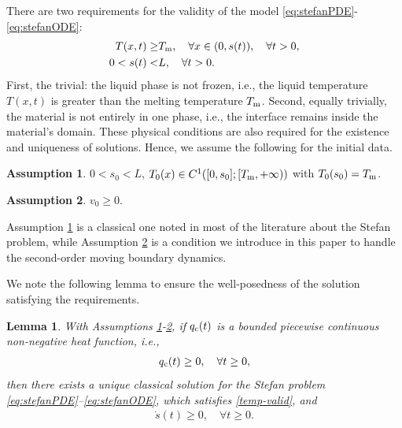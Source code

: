 \documentclass[letterpaper, 10 pt, conference]{cls/ieeeconf}
\newtheorem{lemma}{Lemma}
\theoremstyle{definition}
\newtheorem{assum}{Assumption}
\begin{document}
There are two requirements for the validity of the model \eqref{eq:stefanPDE}-\eqref{eq:stefanODE}:
\begin{align}\label{temp-valid}
T(x,t) \geq& T_{{\rm m}}, \quad  \forall x\in(0,s(t)), \quad \forall t>0, \\
\label{int-valid}0 < s(t)<  &L, \quad \forall t>0. 
\end{align}
First, the trivial: the liquid phase is not frozen, i.e., the liquid temperature $T(x,t)$ is greater than the melting temperature $T_{\rm m}$. Second, equally trivially, the material is not entirely in one phase, i.e., the interface remains inside the material's domain. These physical conditions are also required for the existence and uniqueness of solutions.
Hence, we assume the following for the initial data. 

\begin{assum}\label{ass:initial} 
$0 < s_0 < L$, $T_0(x) \in C^1([0, s_0];[T_{\rm m}, +\infty))$ with $T_0(s_0) = T_{\rm m}$.
 \end{assum}
 \begin{assum}\label{ass:CBFinitial}
     $v_0 \geq 0$. 
 \end{assum}

 Assumption \ref{ass:initial} is a classical one noted in most of the literature about the Stefan problem, while Assumption \ref{ass:CBFinitial} is a condition we introduce in this paper to handle the second-order moving boundary dynamics. 

We note the following lemma to ensure the well-posedness of the solution satisfying the requirements. 
 \begin{lemma}\label{lem1}
With Assumptions \ref{ass:initial}-\ref{ass:CBFinitial}, if $q_{\rm c}(t)$ is a bounded piecewise continuous non-negative heat function, i.e.,
\begin{align} \label{eq:qct-valid}
q_{{\rm c}}(t) \geq 0,  \quad \forall t\geq 0,  
\end{align}
then there exists a unique classical solution for the Stefan problem \eqref{eq:stefanPDE}--\eqref{eq:stefanODE}, which satisfies \eqref{temp-valid}, and 
\begin{align} \label{eq:sdot-pos} 
    \dot s(t) \geq 0, \quad \forall t \geq 0. 
\end{align}

\end{lemma}
\end{document}
